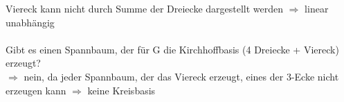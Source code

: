Viereck kann nicht durch Summe der Dreiecke dargestellt werden $\Rightarrow$ linear unabhängig
\\\\
Gibt es einen Spannbaum, der für G die Kirchhoffbasis (4 Dreiecke + Viereck) erzeugt?\\
$\Rightarrow$ nein, da jeder Spannbaum, der das Viereck erzeugt, eines der 3-Ecke nicht erzeugen kann $\Rightarrow$ keine Kreisbasis
